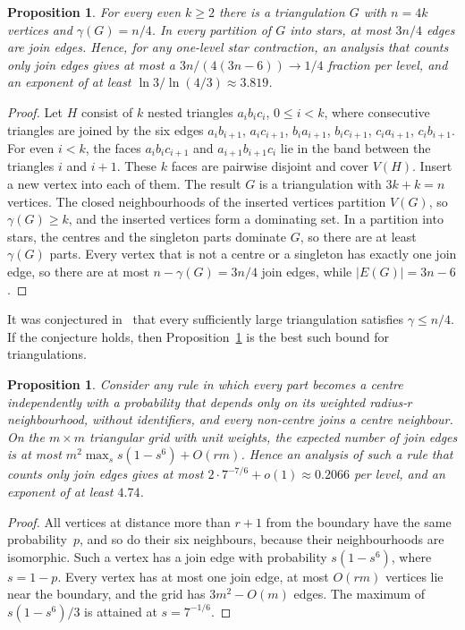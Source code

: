 \documentclass[11pt]{article}
\newtheorem{proposition}[theorem]{Proposition}
\theoremstyle{remark}
\begin{document}
\begin{proposition}\label{prop:jointop}
For every even $k\ge2$ there is a triangulation $G$ with $n=4k$ vertices and $\gamma(G)=n/4$. In
every partition of $G$ into stars, at most $3n/4$ edges are join edges. Hence, for any one-level
star contraction, an analysis that counts only join edges gives at most a $3n/(4(3n-6))\to1/4$
fraction per level, and an exponent of at least $\ln3/\ln(4/3)\approx3.819$.
\end{proposition}
\begin{proof}
Let $H$ consist of $k$ nested triangles $a_ib_ic_i$, $0\le i<k$, where consecutive triangles are joined by
the six edges $a_ib_{i+1}$, $a_ic_{i+1}$, $b_ia_{i+1}$, $b_ic_{i+1}$, $c_ia_{i+1}$, $c_ib_{i+1}$.
For even $i<k$, the faces $a_ib_ic_{i+1}$ and $a_{i+1}b_{i+1}c_i$ lie in the band between the
triangles $i$ and $i+1$. These $k$ faces are pairwise disjoint and cover $V(H)$. Insert a new vertex
into each of them. The result $G$ is a triangulation with $3k+k=n$ vertices. The closed
neighbourhoods of the inserted vertices partition $V(G)$, so $\gamma(G)\ge k$, and the inserted
vertices form a dominating set. In a partition into stars, the centres and the singleton parts
dominate $G$, so there are at least $\gamma(G)$ parts. Every vertex that is not a centre or a
singleton has exactly one join edge, so there are at most $n-\gamma(G)=3n/4$ join edges, while
$|E(G)|=3n-6$.
\end{proof}

It was conjectured in~\cite{MT96} that every sufficiently large triangulation satisfies $\gamma\le n/4$.
If the conjecture holds, then Proposition~\ref{prop:jointop} is the best such bound for triangulations.

\begin{proposition}\label{prop:indep}
Consider any rule in which every part becomes a centre independently with a probability that
depends only on its weighted radius-$r$ neighbourhood, without identifiers, and every non-centre
joins a centre neighbour. On the $m\times m$ triangular grid with unit weights, the expected number
of join edges is at most $m^2\max_{s}s(1-s^6)+O(rm)$. Hence an analysis of such a rule that counts
only join edges gives at most $2\cdot7^{-7/6}+o(1)\approx0.2066$ per level, and an exponent of at
least $4.74$.
\end{proposition}
\begin{proof}
All vertices at distance more than $r+1$ from the boundary have the same probability~$p$, and so do
their six neighbours, because their neighbourhoods are isomorphic. Such a vertex has a join edge
with probability $s(1-s^6)$, where $s=1-p$. Every vertex has at most one join edge, at most $O(rm)$
vertices lie near the boundary, and the grid has $3m^2-O(m)$ edges. The maximum of $s(1-s^6)/3$ is
attained at $s=7^{-1/6}$.
\end{proof}
\end{document}
